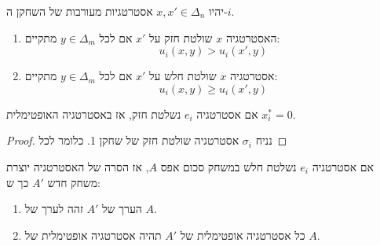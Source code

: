 \documentclass{tstextbook}
\begin{document}
\begin{definition}
יהיו \(x,x' \in \Delta_{n}\) אסטרטגיות מעורבות של השחקן ה-\(i\).

  \begin{enumerate}
    \item האסטרטגיה \(x\) שולטת חזק על \(x'\) אם לכל \(y \in \Delta_{m}\) מתקיים: 
$$u_{i}(x,y)> u_{i}(x',y)$$


    \item אסטרטגיה \(x\) שולטת חלש על \(x'\) אם לכל \(y \in \Delta_{m}\) מתקיים: 
$$u_{i}(x,y)\geq u_{i}(x',y)$$


  \end{enumerate}
\end{definition}
\begin{proposition}
אם אסטרטגיה \(e_{i}\) נשלטת חזק, אז באסטרטגיה האופטימלית \(x^{*}_{i}=0\).

\end{proposition}
\begin{proof}
נניח \(\sigma_{i}\) אסטרטגיה שולטת חזק של שחקן 1. כלומר לכל 

\end{proof}
\begin{proposition}
אם אסטרטגיה \(e_{i}\) נשלטת חלש במשחק סכום אפס \(A\), אז הסרה של האסטרטגיה יוצרת משחק חדש \(A'\) כך ש:

  \begin{enumerate}
    \item הערך של \(A'\) זהה לערך של \(A\). 


    \item כל אסטרטגיה אופטימלית של \(A'\) תהיה אסטרטגיה אופטימלית של \(A\). 


  \end{enumerate}
\end{proposition}
\end{document}
